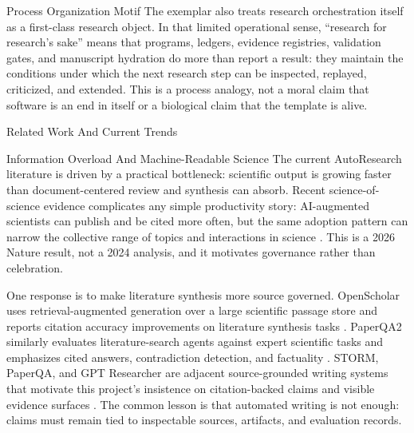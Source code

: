 \documentclass[
  ignorenonframetext,
]{beamer}
\begin{document}
\begin{frame}[allowframebreaks]{Process Organization Motif}
\protect{}\label{sec:process-organization-motif}
The exemplar also treats research orchestration itself as a first-class
research object. In that limited operational sense, ``research for
research's sake'' means that programs, ledgers, evidence registries,
validation gates, and manuscript hydration do more than report a result:
they maintain the conditions under which the next research step can be
inspected, replayed, criticized, and extended. This is a process
analogy, not a moral claim that software is an end in itself or a
biological claim that the template is alive.
\end{frame}

\begin{frame}{Related Work And Current Trends}
\protect{}\label{sec:related-work}
\begin{block}{Information Overload And Machine-Readable Science}
\protect{}\label{sec:information-overload-machine-readable-science}
The current AutoResearch literature is driven by a practical bottleneck:
scientific output is growing faster than document-centered review and
synthesis can absorb. Recent science-of-science evidence complicates any
simple productivity story: AI-augmented scientists can publish and be
cited more often, but the same adoption pattern can narrow the
collective range of topics and interactions in science
. This is a 2026 Nature result, not a
2024 analysis, and it motivates governance rather than celebration.

One response is to make literature synthesis more source governed.
OpenScholar uses retrieval-augmented generation over a large scientific
passage store and reports citation accuracy improvements on literature
synthesis tasks . PaperQA2 similarly
evaluates literature-search agents against expert scientific tasks and
emphasizes cited answers, contradiction detection, and factuality
. STORM, PaperQA, and GPT Researcher
are adjacent source-grounded writing systems that motivate this
project's insistence on citation-backed claims and visible evidence
surfaces . The common lesson is that automated writing
is not enough: claims must remain tied to inspectable sources,
artifacts, and evaluation records.
\end{block}


\end{frame}
\end{document}
